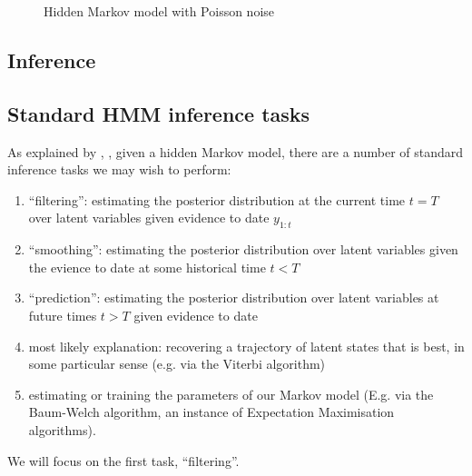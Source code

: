 \documentclass[twoside, 11pt]{article}
\begin{document}
\begin{figure}
\caption{Hidden Markov model with Poisson noise}
\label{fig:hmmpoisson}
\end{figure}

\subsection{Inference}
\subsection{Standard HMM inference tasks}

As explained by \citet{rabiner1989tutorial}, \citet*{russell2002artificial}, given a hidden Markov model, there are a number of standard inference tasks we may wish to perform:

\begin{enumerate}
\item ``filtering'': estimating the posterior distribution at the current time $t=T$ over latent variables given evidence to date $y_{1:t}$
\item ``smoothing'': estimating the posterior distribution over latent variables given the evience to date at some historical time $t<T$
\item ``prediction'': estimating the posterior distribution over latent variables at future times $t>T$ given evidence to date
\item most likely explanation: recovering a trajectory of latent states that is best, in some particular sense (e.g. via the Viterbi algorithm)
\item estimating or training the parameters of our Markov model (E.g. via the Baum-Welch algorithm, an instance of Expectation Maximisation algorithms).
\end{enumerate}

We will focus on the first task, ``filtering''.
\end{document}
